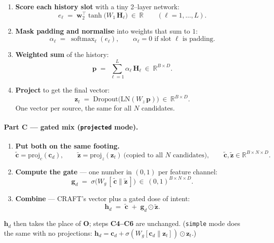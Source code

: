 \documentclass[11pt]{article}
\newcommand{\R}{\mathbb{R}}
\newcommand{\softmax}{\operatorname{softmax}}
\newcommand{\code}[1]{\texttt{\small #1}}
\newcommand{\elt}{\odot}                 %
\newcommand{\concat}{\mathbin{\|}}       %
\newcommand{\LN}{\mathrm{LN}}
\begin{document}
\begin{enumerate}[label=\textbf{V4.\arabic*},leftmargin=3.6em]
  \item \textbf{Score each history slot} with a tiny 2--layer network:
        \[
          e_\ell \;=\; \bm{w}_2^{\top}\tanh\!\big(W_1\,\bm{H}_\ell\big)\ \in\ \R
          \qquad (\ell=1,\dots,L).
        \]

  \item \textbf{Mask padding and normalise} into weights that sum to $1$:
        \[
          \alpha_\ell \;=\; \softmax_\ell(e_\ell),
          \qquad \alpha_\ell = 0 \text{ if slot }\ell\text{ is padding}.
        \]

  \item \textbf{Weighted sum} of the history:
        \[
          \bm{p} \;=\; \sum_{\ell=1}^{L}\alpha_\ell\,\bm{H}_\ell\ \in\ \R^{B\times D}.
        \]

  \item \textbf{Project} to get the final vector:
        \[
          \bm{z}_t \;=\; \mathrm{Dropout}\big(\LN(W_z\,\bm{p})\big)\ \in\ \R^{B\times D}.
        \]
        One vector per source, the same for all $N$ candidates.
\end{enumerate}

\paragraph{Part C --- gated mix (\code{projected} mode).}
\begin{enumerate}[label=\textbf{V4.\arabic*},leftmargin=3.6em,start=5]
  \item \textbf{Put both on the same footing.}
        \[
          \tilde{\bm{c}} = \mathrm{proj}_c(\bm{c}_d),
          \qquad
          \tilde{\bm{z}} = \mathrm{proj}_z(\bm{z}_t)\ \text{(copied to all $N$ candidates)},
          \qquad \tilde{\bm{c}},\tilde{\bm{z}}\in\R^{B\times N\times D}.
        \]

  \item \textbf{Compute the gate} --- one number in $(0,1)$ per feature channel:
        \[
          \bm{g}_d \;=\; \sigma\!\big(W_g\,[\,\tilde{\bm{c}}\concat\tilde{\bm{z}}\,]\big)\ \in\ (0,1)^{B\times N\times D}.
        \]

  \item \textbf{Combine} --- CRAFT's vector plus a gated dose of intent:
        \[
          \bm{h}_d \;=\; \tilde{\bm{c}} \;+\; \bm{g}_d \elt \tilde{\bm{z}}.
        \]
\end{enumerate}
$\bm{h}_d$ then takes the place of $\bm{O}$; steps \textbf{C4--C6} are unchanged.
(\code{simple} mode does the same with no projections:
$\bm{h}_d=\bm{c}_d+\sigma(W_g[\bm{c}_d\concat\bm{z}_t])\elt\bm{z}_t$.)
\end{document}
